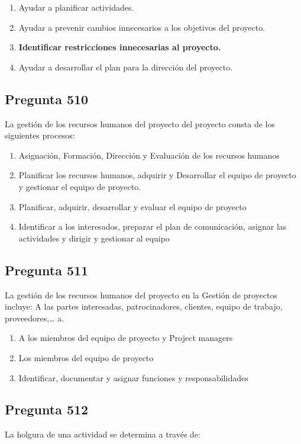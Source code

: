 \documentclass[11pt,a4paper]{article}
\begin{document}
\begin{enumerate}[label=\alph*)]
  \item Ayudar a planificar actividades.
  \item Ayudar a prevenir cambios innecesarios a los objetivos del proyecto.
  \item \textbf{Identificar restricciones innecesarias al proyecto.}
  \item Ayudar a desarrollar el plan para la dirección del proyecto.
\end{enumerate}

\subsection*{Pregunta 510}
La gestión de los recursos humanos del proyecto del proyecto consta de los siguientes procesos:

\begin{enumerate}[label=\alph*)]
  \item Asignación, Formación, Dirección y Evaluación de los recursos humanos
  \item Planificar los recursos humanos, adquirir y Desarrollar el equipo de proyecto y gestionar el equipo de proyecto.
  \item Planificar, adquirir, desarrollar y evaluar el equipo de proyecto
  \item Identificar a los interesados, preparar el plan de comunicación, asignar las actividades y dirigir y gestionar al equipo
\end{enumerate}

\subsection*{Pregunta 511}
La gestión de los recursos humanos del proyecto en la Gestión de proyectos incluye: A las partes interesadas, patrocinadores, clientes, equipo de trabajo, proveedores,… a.

\begin{enumerate}[label=\alph*)]
  \item A los miembros del equipo de proyecto y Project managers
  \item Los miembros del equipo de proyecto
  \item Identificar, documentar y asignar funciones y responsabilidades
\end{enumerate}

\subsection*{Pregunta 512}
La holgura de una actividad se determina a través de:
\end{document}
